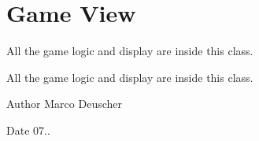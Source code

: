 \hypertarget{group__gameView}{}\section{Game View}
\label{group__gameView}


All the game logic and display are inside this class.  


All the game logic and display are inside this class. 

\begin{DoxyAuthor}{Author}
Marco Deuscher 
\end{DoxyAuthor}
\begin{DoxyDate}{Date}
07.. 
\end{DoxyDate}
